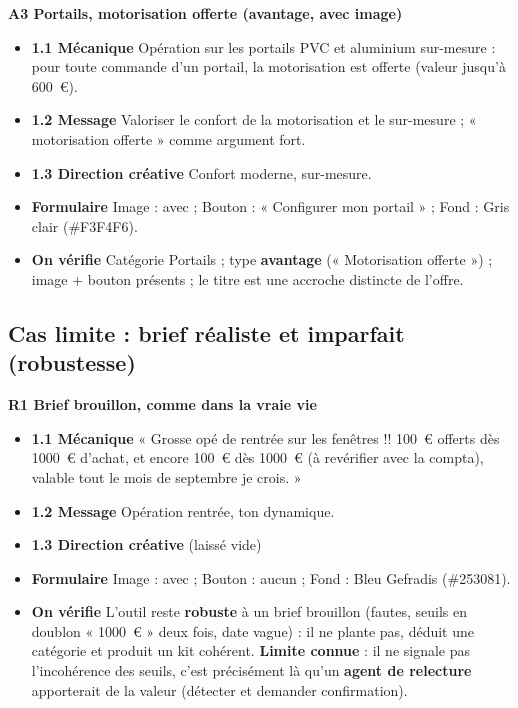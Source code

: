 \documentclass[11pt,a4paper]{article}
\begin{document}
\textbf{A3 \textbullet{} Portails, motorisation offerte (avantage, avec image)}
\begin{itemize}[leftmargin=1.4em]
  \item \textbf{1.1 Mécanique} Opération sur les portails PVC et aluminium sur-mesure : pour
        toute commande d'un portail, la motorisation est offerte (valeur jusqu'à 600~€).
  \item \textbf{1.2 Message} Valoriser le confort de la motorisation et le sur-mesure ;
        « motorisation offerte » comme argument fort.
  \item \textbf{1.3 Direction créative} Confort moderne, sur-mesure.
  \item \textbf{Formulaire} Image : avec ; Bouton : « Configurer mon portail » ; Fond :
        Gris clair (\#F3F4F6).
  \item \textbf{On vérifie} Catégorie Portails ; type \textbf{avantage}
        (« Motorisation offerte ») ; image + bouton présents ; le titre est une accroche
        distincte de l'offre.
\end{itemize}

\subsection{Cas limite : brief réaliste et imparfait (robustesse)}

\textbf{R1 \textbullet{} Brief brouillon, comme dans la vraie vie}
\begin{itemize}[leftmargin=1.4em]
  \item \textbf{1.1 Mécanique} « Grosse opé de rentrée sur les fenêtres !! 100~€ offerts
        dès 1000~€ d'achat, et encore 100~€ dès 1000~€ (à revérifier avec la compta),
        valable tout le mois de septembre je crois. »
  \item \textbf{1.2 Message} Opération rentrée, ton dynamique.
  \item \textbf{1.3 Direction créative} (laissé vide)
  \item \textbf{Formulaire} Image : avec ; Bouton : aucun ; Fond : Bleu Gefradis (\#253081).
  \item \textbf{On vérifie} L'outil reste \textbf{robuste} à un brief brouillon (fautes,
        seuils en doublon « 1000~€ » deux fois, date vague) : il ne plante pas, déduit une
        catégorie et produit un kit cohérent. \textbf{Limite connue} : il ne signale pas
        l'incohérence des seuils, c'est précisément là qu'un \textbf{agent de relecture}
        apporterait de la valeur (détecter et demander confirmation).
\end{itemize}
\end{document}
